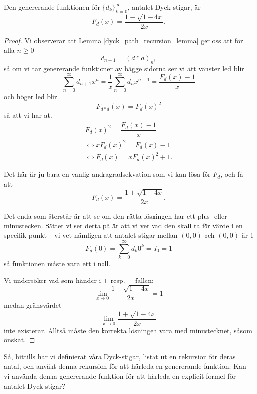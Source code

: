 \documentclass{tufte-handout}
\def\Lrarr{\Leftrightarrow}
\begin{document}
\begin{proposition}
    Den genererande funktionen för $\{d_k\}_{k=0}^\infty$, antalet Dyck-stigar, är
    $$F_d(x) = \frac{1 - \sqrt{1 - 4x}}{2x}.$$

    \begin{proof}
        Vi observerar att Lemma \ref{dyck_path_recursion_lemma} ger oss att för alla $n \geq 0$
        $$d_{n+1} = (d*d)_n,$$
        så om vi tar genererande funktioner av bägge sidorna ser vi att vänster led blir
        $$\sum_{n=0}^{\infty}d_{n+1}x^n = \frac{1}{x}\sum_{n=0}^{\infty} d_n x^{n+1} = \frac{F_d(x) - 1}{x}$$ %
        och höger led blir
        $$F_{d * d}(x) = F_d(x)^2$$
        så att vi har att
        \begin{equation*}
          \begin{gathered}
            F_d(x)^2 = \dfrac{F_d(x)-1}{x}\\
            \Lrarr xF_d(x)^2 = F_d(x)-1\\
            \Lrarr F_d(x) = x F_d(x)^2 + 1.
          \end{gathered}
        \end{equation*}

        Det här är ju bara en vanlig andragradsekvation som vi kan lösa för $F_d$, och få att
        $$F_d(x) = \frac{1 \pm \sqrt{1 - 4x}}{2x}.$$

        Det enda som återstår är att se om den rätta lösningen har ett plus- eller minustecken. Sättet vi ser detta på är att vi vet vad den skall ta för värde i en specifik punkt -- vi vet nämligen att antalet stigar mellan $(0,0)$ och $(0,0)$ är 1
        $$F_d(0) = \sum_{k=0}^{\infty} d_k 0^k = d_0 = 1$$
        så funktionen måste vara ett i noll.

        Vi undersöker vad som händer i $+$ resp. $-$ fallen:
        $$\lim_{x \to 0} \frac{1 - \sqrt{1 - 4x}}{2x} = 1$$
        medan gränsvärdet
        $$\lim_{x \to 0} \frac{1 + \sqrt{1 - 4x}}{2x}$$
        inte existerar. Alltså måste den korrekta lösningen vara med minustecknet, såsom önskat.
    \end{proof}
\end{proposition}

Så, hittills har vi definierat våra Dyck-stigar, listat ut en rekursion för deras antal, och använt denna rekursion för att härleda en genererande funktion. Kan vi använda denna genererande funktion för att härleda en explicit formel för antalet Dyck-stigar?
\end{document}
